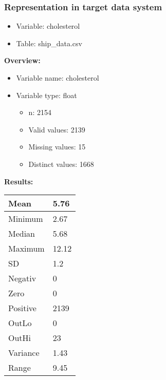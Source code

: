 \documentclass[
]{article}
\providecommand{\tightlist}{%
  \setlength{\itemsep}{0pt}\setlength{\parskip}{0pt}}
\begin{document}
\newpage

\hypertarget{representation-in-target-data-system-1}{%
\subsubsection{\texorpdfstring{Representation in \textbf{target} data
system}{Representation in target data system}}\label{representation-in-target-data-system-1}}

\begin{itemize}
\tightlist
\item
  Variable: cholesterol
\item
  Table: ship\_data.csv
\end{itemize}

\textbf{Overview:}

\begin{itemize}
\tightlist
\item
  Variable name: cholesterol
\item
  Variable type: float

  \begin{itemize}
  \tightlist
  \item
    n: 2154
  \item
    Valid values: 2139
  \item
    Missing values: 15
  \item
    Distinct values: 1668
  \end{itemize}
\end{itemize}

\textbf{Results:}\\

\begin{table}[H]
\centering
\begin{tabular}{l|l}
\hline
Mean & 5.76\\
\hline
Minimum & 2.67\\
\hline
Median & 5.68\\
\hline
Maximum & 12.12\\
\hline
SD & 1.2\\
\hline
Negativ & 0\\
\hline
Zero & 0\\
\hline
Positive & 2139\\
\hline
OutLo & 0\\
\hline
OutHi & 23\\
\hline
Variance & 1.43\\
\hline
Range & 9.45\\
\hline
\end{tabular}
\end{table}
\end{document}
